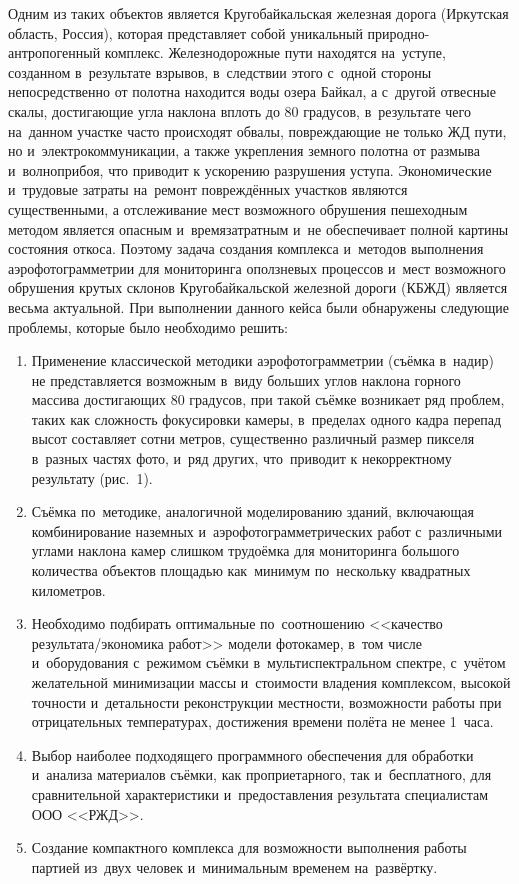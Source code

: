 Одним из таких объектов является Кругобайкальская железная дорога (Иркутская область, Россия), которая представляет собой уникальный природно-антропогенный комплекс. Железнодорожные пути находятся на~уступе, созданном в~результате взрывов, в~следствии этого с~одной стороны непосредственно от полотна находится воды озера Байкал, а с~другой отвесные скалы, достигающие угла наклона вплоть до 80 градусов, в~результате чего на~данном участке часто происходят обвалы, повреждающие не только ЖД пути, но и~электрокоммуникации, а также укрепления земного полотна от размыва и~волноприбоя, что приводит к ускорению разрушения уступа. Экономические и~трудовые затраты на~ремонт повреждённых участков являются существенными, а отслеживание мест возможного обрушения пешеходным методом является опасным и~времязатратным и~не обеспечивает полной картины состояния откоса. Поэтому задача создания комплекса и~методов выполнения аэрофотограмметрии для мониторинга оползневых процессов и~мест возможного обрушения крутых склонов Кругобайкальской железной дороги (КБЖД) является весьма актуальной.
\clearpage
При выполнении данного кейса были обнаружены следующие проблемы, которые было необходимо решить:
\begin{enumerate}[noitemsep]\vspace{-8pt}
\item Применение классической методики аэрофотограмметрии (съёмка в~надир) не представляется возможным в~виду больших углов наклона горного массива достигающих 80 градусов, при такой съёмке возникает ряд проблем, таких как сложность фокусировки камеры, в~пределах одного кадра перепад высот составляет сотни метров, существенно различный размер пикселя в~разных частях фото, и~ряд других, что~приводит к некорректному результату (рис.~1).



\item Съёмка по~методике, аналогичной моделированию зданий, включающая комбинирование наземных и~аэрофотограмметрических работ с~различными углами наклона камер слишком трудоёмка для мониторинга большого количества объектов площадью как~минимум по~нескольку квадратных километров.
\item Необходимо подбирать оптимальные по~соотношению <<качество результата/экономика работ>> модели фотокамер, в~том числе и~оборудования с~режимом съёмки в~мультиспектральном спектре, с~учётом желательной минимизации массы и~стоимости владения комплексом, высокой точности и~детальности реконструкции местности, возможности работы при отрицательных температурах, достижения времени полёта не менее 1~часа.
\item Выбор наиболее подходящего программного обеспечения для обработки и~анализа материалов съёмки, как проприетарного, так и~бесплатного, для сравнительной характеристики и~предоставления результата специалистам ООО <<РЖД>>.
\item Создание компактного комплекса для возможности выполнения работы партией из~двух человек и~минимальным временем на~развёртку.

\end{enumerate}
\vspace{-8pt}

